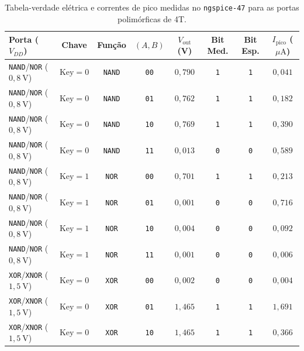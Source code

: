 \begin{table}[htbp]
\centering
\caption{Tabela-verdade el\'{e}trica e correntes de pico medidas no \texttt{ngspice-47} para as portas polim\'{o}rficas de 4T.}
\label{tab:portas_polimorficas}
\footnotesize
\begin{tabular}{l c c c c c c c}
\toprule
\textbf{Porta ($V_{DD}$)} & \textbf{Chave} & \textbf{Fun\c{c}\~{a}o} & $(A,B)$ & $V_{\mathrm{out}}$ (V) & \textbf{Bit Med.} & \textbf{Bit Esp.} & $I_{\mathrm{pico}}$ ($\mu\text{A}$) \\
\midrule
\texttt{NAND}/\texttt{NOR} ($0{,}8\ \text{V}$) & $\text{Key}=0$ & \texttt{NAND} & \texttt{00} & $0{,}790$ & \texttt{1} & \texttt{1} & $0{,}041$ \\
\texttt{NAND}/\texttt{NOR} ($0{,}8\ \text{V}$) & $\text{Key}=0$ & \texttt{NAND} & \texttt{01} & $0{,}762$ & \texttt{1} & \texttt{1} & $0{,}182$ \\
\texttt{NAND}/\texttt{NOR} ($0{,}8\ \text{V}$) & $\text{Key}=0$ & \texttt{NAND} & \texttt{10} & $0{,}769$ & \texttt{1} & \texttt{1} & $0{,}390$ \\
\texttt{NAND}/\texttt{NOR} ($0{,}8\ \text{V}$) & $\text{Key}=0$ & \texttt{NAND} & \texttt{11} & $0{,}013$ & \texttt{0} & \texttt{0} & $0{,}589$ \\
\texttt{NAND}/\texttt{NOR} ($0{,}8\ \text{V}$) & $\text{Key}=1$ & \texttt{NOR}  & \texttt{00} & $0{,}701$ & \texttt{1} & \texttt{1} & $0{,}213$ \\
\texttt{NAND}/\texttt{NOR} ($0{,}8\ \text{V}$) & $\text{Key}=1$ & \texttt{NOR}  & \texttt{01} & $0{,}001$ & \texttt{0} & \texttt{0} & $0{,}716$ \\
\texttt{NAND}/\texttt{NOR} ($0{,}8\ \text{V}$) & $\text{Key}=1$ & \texttt{NOR}  & \texttt{10} & $0{,}004$ & \texttt{0} & \texttt{0} & $0{,}092$ \\
\texttt{NAND}/\texttt{NOR} ($0{,}8\ \text{V}$) & $\text{Key}=1$ & \texttt{NOR}  & \texttt{11} & $0{,}001$ & \texttt{0} & \texttt{0} & $0{,}006$ \\
\midrule
\texttt{XOR}/\texttt{XNOR} ($1{,}5\ \text{V}$) & $\text{Key}=0$ & \texttt{XOR}  & \texttt{00} & $0{,}002$ & \texttt{0} & \texttt{0} & $0{,}004$ \\
\texttt{XOR}/\texttt{XNOR} ($1{,}5\ \text{V}$) & $\text{Key}=0$ & \texttt{XOR}  & \texttt{01} & $1{,}465$ & \texttt{1} & \texttt{1} & $1{,}691$ \\
\texttt{XOR}/\texttt{XNOR} ($1{,}5\ \text{V}$) & $\text{Key}=0$ & \texttt{XOR}  & \texttt{10} & $1{,}465$ & \texttt{1} & \texttt{1} & $0{,}366$ \\

\end{tabular}
\end{table}
